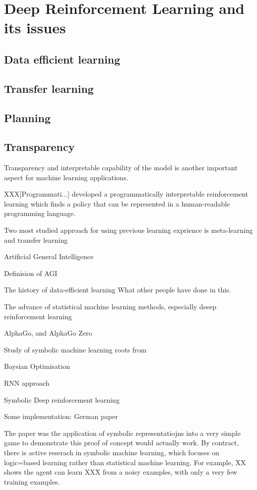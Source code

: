 \documentclass[12pt,twoside]{report}
\begin{document}
\section{Deep Reinforcement Learning and its issues}

\subsection{Data efficient learning}

\subsection{Transfer learning}

\subsection{Planning}

\subsection{Transparency}

Transparency and interpretable capability of the model is another important aspect for machine learning applications.


XXX[Programmati...] developed a programmatically interpretable reinforcement learning which finds a policy that can be represented in a human-readable programming language.


Two most studied approach for using previous learning exprience is meta-learning and transfer learning

Artificial General Intelligence

Definision of AGI

The history of data-efficient learning
What other people have done in this.

The advance of statistical machine learning methods, especially deeep reinforcement learning

AlphaGo, and AlphaGo Zero

Study of symbolic machine learning roots from

Baysian Optimisation

RNN approach

Symbolic Deep reinforcement learning

Some implementation: German paper

The paper was the application of symbolic representatiojns into a very simple game to demonstrate this proof of concept would actually work.
By contract, there is active reserach in symbolic machine learning, which focuses on logic=based learning rather than statistical machine learning.
For example, XX shows the agent can learn XXX from a noisy examples, with only a very few training examples.
\end{document}
